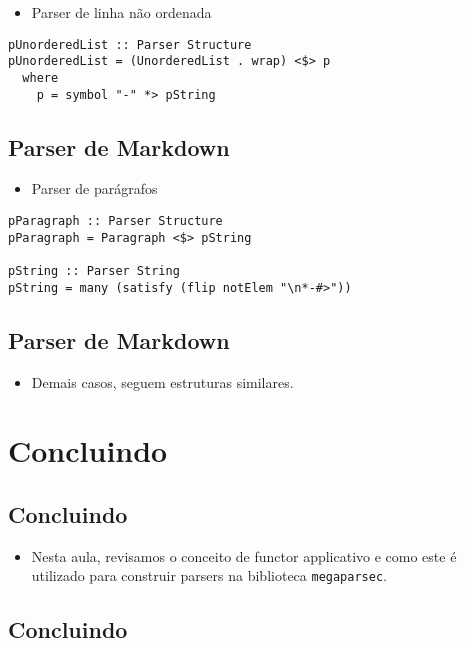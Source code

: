 \documentclass[11pt]{article}
\begin{document}
\begin{itemize}
\item Parser de linha não ordenada
\end{itemize}

\begin{verbatim}
pUnorderedList :: Parser Structure
pUnorderedList = (UnorderedList . wrap) <$> p
  where
    p = symbol "-" *> pString
\end{verbatim}
\subsection*{Parser de Markdown}
\label{sec:org61c41d5}

\begin{itemize}
\item Parser de parágrafos
\end{itemize}

\begin{verbatim}
pParagraph :: Parser Structure
pParagraph = Paragraph <$> pString

pString :: Parser String
pString = many (satisfy (flip notElem "\n*-#>"))
\end{verbatim}
\subsection*{Parser de Markdown}
\label{sec:org2f5df19}

\begin{itemize}
\item Demais casos, seguem estruturas similares.
\end{itemize}
\section*{Concluindo}
\label{sec:org1fb8c55}

\subsection*{Concluindo}
\label{sec:orga25f746}

\begin{itemize}
\item Nesta aula, revisamos o conceito de functor applicativo e
como este é utilizado para construir parsers na biblioteca
\texttt{megaparsec}.
\end{itemize}
\subsection*{Concluindo}
\label{sec:orgc95670f}
\end{document}
